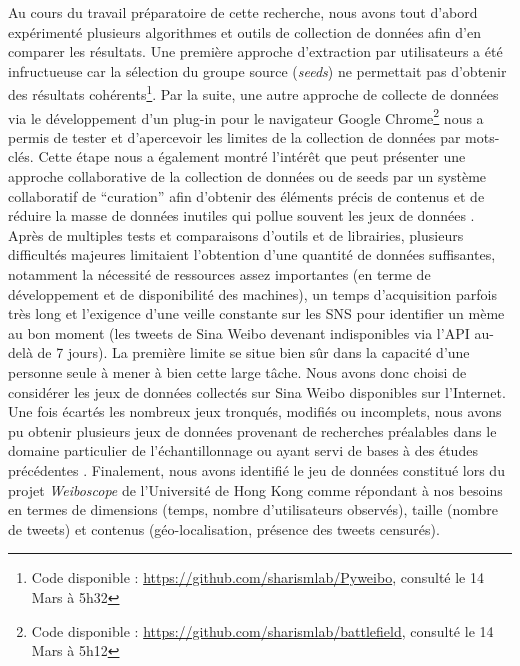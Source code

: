 Au cours du travail préparatoire de cette recherche, nous avons tout d{\textquoteright}abord expérimenté plusieurs algorithmes et outils de collection de données afin d{\textquoteright}en comparer les résultats. Une première approche d{\textquoteright}extraction par utilisateurs a été infructueuse car la sélection du groupe source (\textit{seeds}) ne permettait pas d{\textquoteright}obtenir des résultats cohérents\footnote{Code disponible : \url{https://github.com/sharismlab/Pyweibo}, consulté le 14 Mars à 5h32}. Par la suite, une autre approche de collecte de données via le développement d{\textquoteright}un plug-in pour le navigateur Google Chrome\footnote{Code disponible : \url{https://github.com/sharismlab/battlefield}, consulté le 14 Mars à 5h12} nous a permis de tester et d{\textquoteright}apercevoir les limites de la collection de données par mots-clés. Cette étape nous a également montré l{\textquoteright}intér\^et que peut présenter une approche collaborative de la collection de données ou de seeds par un système collaboratif de {\textquotedblleft}curation{\textquotedblright} afin d{\textquoteright}obtenir des éléments précis de contenus et de réduire la masse de données inutiles qui pollue souvent les jeux de données \citep{Ding2013}. Après de multiples tests et comparaisons d{\textquoteright}outils et de librairies, plusieurs difficultés majeures limitaient l{\textquoteright}obtention d{\textquoteright}une quantité de données suffisantes, notamment la nécessité de ressources assez importantes (en terme de développement et de disponibilité des machines), un temps d{\textquoteright}acquisition parfois très long et l{\textquoteright}exigence d{\textquoteright}une veille constante sur les SNS pour identifier un mème au bon moment (les tweets de Sina Weibo devenant indisponibles via l{\textquoteright}API au-delà de 7 jours). La première limite se situe bien s\^ur dans la capacité d{\textquoteright}une personne seule à mener à bien cette large t\^ache. Nous avons donc choisi de considérer les jeux de données collectés sur Sina Weibo disponibles sur l{\textquoteright}Internet. Une fois écartés les nombreux jeux tronqués, modifiés ou incomplets, nous avons pu obtenir plusieurs jeux de données provenant de recherches préalables dans le domaine particulier de l{\textquoteright}échantillonnage \citep{Ding2013} ou ayant servi de bases à des études précédentes \citep{Gao2012}. Finalement, nous avons identifié le jeu de données constitué lors du projet \textit{Weiboscope }de l{\textquoteright}Université de Hong Kong comme répondant à nos besoins en termes de dimensions (temps, nombre d{\textquoteright}utilisateurs observés), taille (nombre de tweets) et contenus (géo-localisation, présence des tweets censurés).


